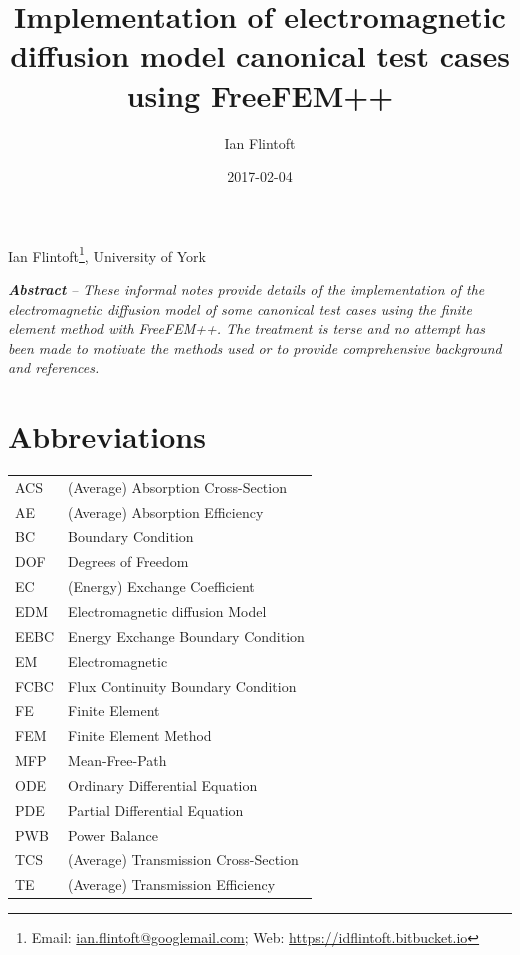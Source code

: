 \documentclass[a4paper]{article}
\title{Implementation of electromagnetic diffusion model canonical test cases using FreeFEM++}
\author{Ian Flintoft}
\date{2017-02-04}
\newcommand{\mydate}{\formatdate{3}{6}{2017}}
\numberwithin{equation}{section}
\begin{document}
\clearpage{}
\vspace{5mm}
\thispagestyle{plain}
{\centering\large 
Ian Flintoft\footnote{ Email: \href{mailto:ian.flintoft@googlemail.com}{ian.flintoft@googlemail.com}; 
Web: \url{https://idflintoft.bitbucket.io}}, University of York
\par}
\vspace{5mm}
{\centering
\mydate
\par}
\vspace{5mm}
\textbf{\textit{Abstract}}\textit{ -- These informal notes provide details of the implementation of the 
electromagnetic diffusion model of some canonical test cases using the finite element method
with FreeFEM++. The treatment is terse and no attempt has been made to motivate the methods used or to provide
comprehensive background and references. 
}
%
\setcounter{tocdepth}{3}
\renewcommand\contentsname{Contents}
\tableofcontents
%
\newpage

\section*{Abbreviations}
\label{sc:abbrev}

\begin{supertabular}{m{2cm}l}
ACS              & (Average) Absorption Cross-Section  \\
AE               &(Average) Absorption Efficiency      \\
BC               &Boundary Condition                   \\
DOF              &Degrees of Freedom                   \\
EC               &(Energy) Exchange Coefficient        \\
EDM              &Electromagnetic diffusion Model      \\
EEBC             &Energy Exchange Boundary Condition   \\
EM               &Electromagnetic                      \\
FCBC             &Flux Continuity Boundary Condition   \\
FE               &Finite Element                       \\
FEM              &Finite Element Method                \\
MFP              &Mean-Free-Path                       \\
ODE              &Ordinary Differential Equation       \\
PDE              &Partial Differential Equation        \\
PWB              &Power Balance                        \\
TCS              &(Average) Transmission Cross-Section \\
TE               &(Average) Transmission Efficiency    \\
\end{supertabular}
\end{document}

